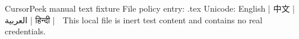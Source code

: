 CursorPeek manual text fixture
File policy entry: .tex
Unicode: English | 中文 | العربية | हिन्दी | 🧪
This local file is inert test content and contains no real credentials.
